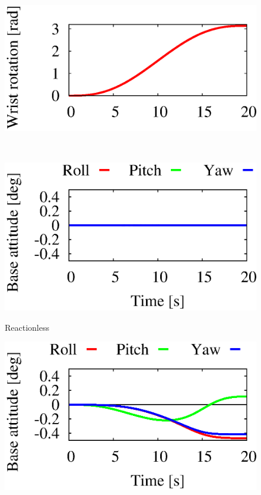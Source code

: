 \begin{figure}[t]
\begin{minipage}[h]{0.40\linewidth}
  \end{minipage}
  \begin{minipage}[h]{0.40\linewidth}
    \includegraphics[width=1.0\linewidth]{fig/chapter4/inspection/case1/CONV/U12_rotation_angle.eps}
  \end{minipage}\\
  \vspace{-5mm}
  \begin{minipage}[h]{0.40\linewidth}
    \centering
    \includegraphics[width=1.0\linewidth]{fig/chapter4/inspection/case1/RL-M/X02_Base_Orientation.eps}
    \footnotesize\par{\hspace{8mm}\vspace{-2mm}Reactionless}
  \end{minipage}
  \begin{minipage}[h]{0.40\linewidth}
    \centering
    \includegraphics[width=1.0\linewidth]{fig/chapter4/inspection/case1/CONV/X02_Base_Orientation.eps}

\end{minipage}
\end{figure}
